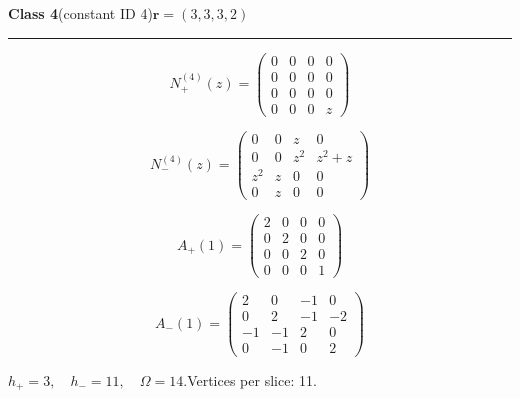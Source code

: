 \noindent\begin{minipage}{\linewidth}
\noindent\textbf{Class 4}\quad\small (constant ID 4)\hfill $\symbf{r}=(3,3,3,2)$
\par\smallskip\noindent\textcolor{rulegray}{\rule{\linewidth}{0.3pt}}
\begin{minipage}[c]{0.495\linewidth}\centering\fontsize{9.7}{12}\selectfont
\setlength{\abovedisplayskip}{4pt}\setlength{\belowdisplayskip}{4pt}
\setlength{\abovedisplayshortskip}{4pt}\setlength{\belowdisplayshortskip}{4pt}
\setlength{\arraycolsep}{3pt}\renewcommand{\arraystretch}{1.08}
\[N_{+}^{(4)}(z)=\begin{pmatrix}0 & 0 & 0 & 0\\0 & 0 & 0 & 0\\0 & 0 & 0 & 0\\0 & 0 & 0 & z\end{pmatrix}\]
\end{minipage}%
\begin{minipage}[c]{0.495\linewidth}\centering\fontsize{9.7}{12}\selectfont
\setlength{\abovedisplayskip}{4pt}\setlength{\belowdisplayskip}{4pt}
\setlength{\abovedisplayshortskip}{4pt}\setlength{\belowdisplayshortskip}{4pt}
\setlength{\arraycolsep}{3pt}\renewcommand{\arraystretch}{1.08}
\[N_{-}^{(4)}(z)=\begin{pmatrix}0 & 0 & z & 0\\0 & 0 & z^{2} & z^{2} + z\\z^{2} & z & 0 & 0\\0 & z & 0 & 0\end{pmatrix}\]
\end{minipage}%
\par\noindent
\begin{minipage}[c]{0.495\linewidth}\centering\fontsize{9.7}{12}\selectfont
\setlength{\abovedisplayskip}{4pt}\setlength{\belowdisplayskip}{4pt}
\setlength{\abovedisplayshortskip}{4pt}\setlength{\belowdisplayshortskip}{4pt}
\setlength{\arraycolsep}{3pt}\renewcommand{\arraystretch}{1.08}
\[A_{+}(1)=\begin{pmatrix}2 & 0 & 0 & 0\\0 & 2 & 0 & 0\\0 & 0 & 2 & 0\\0 & 0 & 0 & 1\end{pmatrix}\]
\end{minipage}%
\begin{minipage}[c]{0.495\linewidth}\centering\fontsize{9.7}{12}\selectfont
\setlength{\abovedisplayskip}{4pt}\setlength{\belowdisplayskip}{4pt}
\setlength{\abovedisplayshortskip}{4pt}\setlength{\belowdisplayshortskip}{4pt}
\setlength{\arraycolsep}{3pt}\renewcommand{\arraystretch}{1.08}
\[A_{-}(1)=\begin{pmatrix}2 & 0 & -1 & 0\\0 & 2 & -1 & -2\\-1 & -1 & 2 & 0\\0 & -1 & 0 & 2\end{pmatrix}\]
\end{minipage}%
\par\smallskip\noindent\small $h_+=3,\quad h_-=11,\quad \Omega=14.$\quad Vertices per slice: 11.
\end{minipage}\par\vfill
